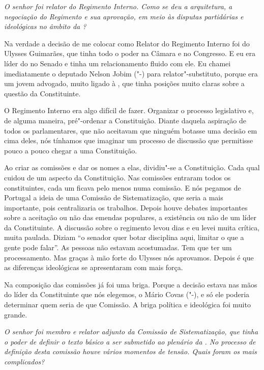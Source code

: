 \medskip

\noindent\emph{O senhor foi relator do Regimento Interno. Como se deu a
arquitetura, a negociação do Regimento e sua aprovação, em meio às
disputas partidárias e ideológicas no âmbito da ?}

Na verdade a decisão de me colocar como Relator do
Regimento Interno foi do Ulysses Guimarães, que tinha todo o poder na
Câmara e no Congresso. E eu era líder do  no Senado e tinha um
relacionamento fluido com ele. Eu chamei imediatamente o deputado Nelson
Jobim ("-) para relator"-substituto, porque era um jovem advogado,
muito ligado à , que tinha posições muito claras sobre a questão da
Constituinte.

O Regimento Interno era algo difícil de fazer. Organizar o processo
legislativo e, de alguma maneira, pré"-ordenar a Constituição. Diante
daquela aspiração de todos os parlamentares, que não aceitavam que
ninguém botasse uma decisão em cima deles, nós tínhamos que imaginar um
processo de discussão que permitisse pouco a pouco chegar a uma
Constituição.

Ao criar as comissões e dar os nomes a elas, dividiu"-se a Constituição.
Cada qual cuidou de um aspecto da Constituição. Nas comissões entraram
todos os constituintes, cada um ficava pelo menos numa comissão. E nós
pegamos de Portugal a ideia de uma Comissão de Sistematização, que seria
a mais importante, pois centralizaria os trabalhos. Depois houve debates
importantes sobre a aceitação ou não das emendas populares, a existência
ou não de um líder da Constituinte. A discussão sobre o regimento levou
dias e eu levei muita crítica, muita paulada. Diziam ``o senador quer
botar disciplina aqui, limitar o que a gente pode falar''. As pessoas
não estavam acostumadas. Tem que ter um processamento. Mas graças à mão
forte do Ulysses nós aprovamos. Depois é que as diferenças ideológicas
se apresentaram com mais força.

Na composição das comissões já foi uma briga. Porque a decisão estava
nas mãos do líder da Constituinte que nós elegemos, o Mário Covas
("-), e só ele poderia determinar quem seria de que Comissão. A
briga política e ideológica foi muito grande.

\medskip

\noindent\emph{O senhor foi membro e relator adjunto da Comissão de
Sistematização, que tinha o poder de definir o texto básico a ser
submetido ao plenário da . No processo de definição desta comissão
houve vários momentos de tensão. Quais foram os mais complicados?}


